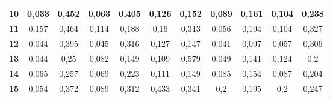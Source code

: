 \begin{table}[]
{\begin{tabular}{ccccccccccc}
\multicolumn{1}{|c|}{\textbf{10}}       & \multicolumn{1}{c|}{0,033}             & \multicolumn{1}{c|}{0,452}          & \multicolumn{1}{c|}{0,063}             & \multicolumn{1}{c|}{0,405}          & \multicolumn{1}{c|}{0,126}             & \multicolumn{1}{c|}{0,152}          & \multicolumn{1}{c|}{0,089}             & \multicolumn{1}{c|}{0,161}          & \multicolumn{1}{c|}{0,104}             & \multicolumn{1}{c|}{0,238}          \\ \hline
\multicolumn{1}{|c|}{\textbf{11}}       & \multicolumn{1}{c|}{0,157}             & \multicolumn{1}{c|}{0,464}          & \multicolumn{1}{c|}{0,114}             & \multicolumn{1}{c|}{0,188}          & \multicolumn{1}{c|}{0,16}              & \multicolumn{1}{c|}{0,313}          & \multicolumn{1}{c|}{0,056}             & \multicolumn{1}{c|}{0,194}          & \multicolumn{1}{c|}{0,104}             & \multicolumn{1}{c|}{0,327}          \\ \hline
\multicolumn{1}{|c|}{\textbf{12}}       & \multicolumn{1}{c|}{0,044}             & \multicolumn{1}{c|}{0,395}          & \multicolumn{1}{c|}{0,045}             & \multicolumn{1}{c|}{0,316}          & \multicolumn{1}{c|}{0,127}             & \multicolumn{1}{c|}{0,147}          & \multicolumn{1}{c|}{0,041}             & \multicolumn{1}{c|}{0,097}          & \multicolumn{1}{c|}{0,057}             & \multicolumn{1}{c|}{0,306}          \\ \hline
\multicolumn{1}{|c|}{\textbf{13}}       & \multicolumn{1}{c|}{0,044}             & \multicolumn{1}{c|}{0,25}           & \multicolumn{1}{c|}{0,082}             & \multicolumn{1}{c|}{0,149}          & \multicolumn{1}{c|}{0,109}             & \multicolumn{1}{c|}{0,579}          & \multicolumn{1}{c|}{0,049}             & \multicolumn{1}{c|}{0,141}          & \multicolumn{1}{c|}{0,124}             & \multicolumn{1}{c|}{0,2}            \\ \hline
\multicolumn{1}{|c|}{\textbf{14}}       & \multicolumn{1}{c|}{0,065}             & \multicolumn{1}{c|}{0,257}          & \multicolumn{1}{c|}{0,069}             & \multicolumn{1}{c|}{0,223}          & \multicolumn{1}{c|}{0,111}             & \multicolumn{1}{c|}{0,149}          & \multicolumn{1}{c|}{0,085}             & \multicolumn{1}{c|}{0,154}          & \multicolumn{1}{c|}{0,087}             & \multicolumn{1}{c|}{0,204}          \\ \hline
\multicolumn{1}{|c|}{\textbf{15}}       & \multicolumn{1}{c|}{0,054}             & \multicolumn{1}{c|}{0,372}          & \multicolumn{1}{c|}{0,089}             & \multicolumn{1}{c|}{0,312}          & \multicolumn{1}{c|}{0,433}             & \multicolumn{1}{c|}{0,341}          & \multicolumn{1}{c|}{0,2}               & \multicolumn{1}{c|}{0,195}          & \multicolumn{1}{c|}{0,2}               & \multicolumn{1}{c|}{0,247}          \\ \hline

\end{tabular}}
\end{table}
